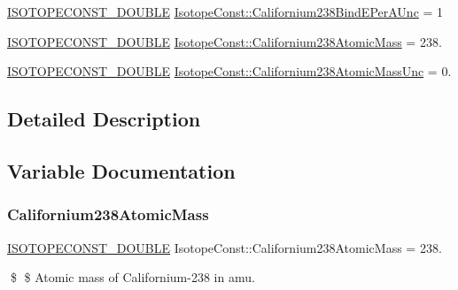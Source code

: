 \begin{DoxyCompactItemize}
\mbox{\hyperlink{group___isotope_const-_macros_ga8f45a7272ce02c0b4c65c44636ed719a}{I\+S\+O\+T\+O\+P\+E\+C\+O\+N\+S\+T\+\_\+\+D\+O\+U\+B\+LE}} \mbox{\hyperlink{group___isotope_const-_californium-_cf238_ga062d394abe5326237b7d491a0d5fd163}{Isotope\+Const\+::\+Californium238\+Bind\+E\+Per\+A\+Unc}} = 1
\item 
\mbox{\hyperlink{group___isotope_const-_macros_ga8f45a7272ce02c0b4c65c44636ed719a}{I\+S\+O\+T\+O\+P\+E\+C\+O\+N\+S\+T\+\_\+\+D\+O\+U\+B\+LE}} \mbox{\hyperlink{group___isotope_const-_californium-_cf238_ga05c966f86f5fbc1b3d7e7ee62a3fe144}{Isotope\+Const\+::\+Californium238\+Atomic\+Mass}} = 238.
\item 
\mbox{\hyperlink{group___isotope_const-_macros_ga8f45a7272ce02c0b4c65c44636ed719a}{I\+S\+O\+T\+O\+P\+E\+C\+O\+N\+S\+T\+\_\+\+D\+O\+U\+B\+LE}} \mbox{\hyperlink{group___isotope_const-_californium-_cf238_gae33893db9ea9759f6b530a5e0d5f6c29}{Isotope\+Const\+::\+Californium238\+Atomic\+Mass\+Unc}} = 0.
\end{DoxyCompactItemize}


\subsection{Detailed Description}


\subsection{Variable Documentation}
\mbox{\label{group___isotope_const-_californium-_cf238_ga05c966f86f5fbc1b3d7e7ee62a3fe144}} 
\subsubsection{\texorpdfstring{Californium238\+Atomic\+Mass}{Californium238AtomicMass}}
{\footnotesize\ttfamily \mbox{\hyperlink{group___isotope_const-_macros_ga8f45a7272ce02c0b4c65c44636ed719a}{I\+S\+O\+T\+O\+P\+E\+C\+O\+N\+S\+T\+\_\+\+D\+O\+U\+B\+LE}} Isotope\+Const\+::\+Californium238\+Atomic\+Mass = 238.}

\$ \$ Atomic mass of Californium-\/238 in amu. \mbox{\label{group___isotope_const-_californium-_cf238_gae33893db9ea9759f6b530a5e0d5f6c29}} 
